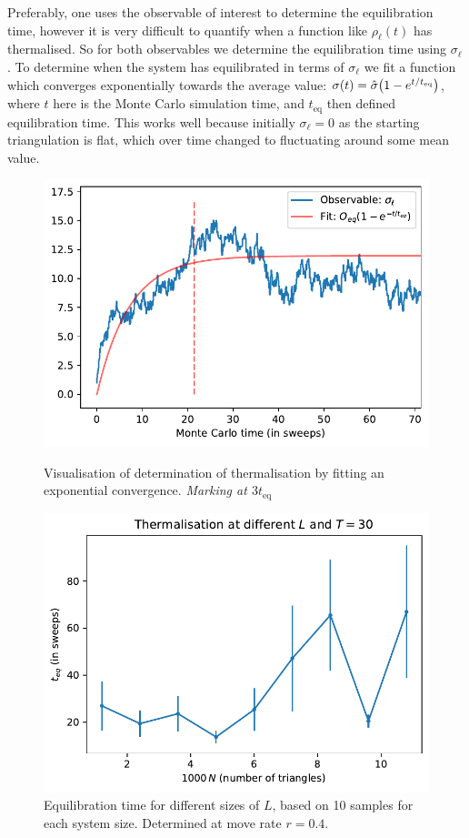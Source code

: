 Preferably, one uses the observable of interest to determine the equilibration time, however it is very difficult to quantify when a function like $\rho_\ell(t)$ has thermalised. So for both observables we determine the equilibration time using $\sigma_\ell$.
To determine when the system has equilibrated in terms of $\sigma_\ell$ we fit a function which converges exponentially towards the average value:
$\sigma(t) = \hat\sigma \qty(1 - e^{t/t_\text{eq}})$, where $t$ here is the Monte Carlo simulation time, and $t_\text{eq}$ then defined equilibration time.
This works well because initially $\sigma_\ell = 0$ as the starting triangulation is flat, which over time changed to fluctuating around some mean value.
\begin{figure}[ht]
    \centering
    \begin{minipage}[t]{0.47\linewidth}
        \centering
        \includegraphics[width=0.95\linewidth]{img/teq_thermalisation.pdf}
        \caption{Visualisation of determination of thermalisation by fitting an exponential convergence. \textit{Marking at $3t_\text{eq}$}}
        \label{fig:thermalisation}
    \end{minipage}
    \hfill
    \begin{minipage}[t]{0.48\linewidth}
        \centering
        \includegraphics[width=0.95\linewidth]{img/teq-Ldep.pdf}
        \caption{Equilibration time for different sizes of $L$, based on 10 samples for each system size. Determined at move rate $r=0.4$.}
        \label{fig:teq_Ldep}
    \end{minipage}
\end{figure}
